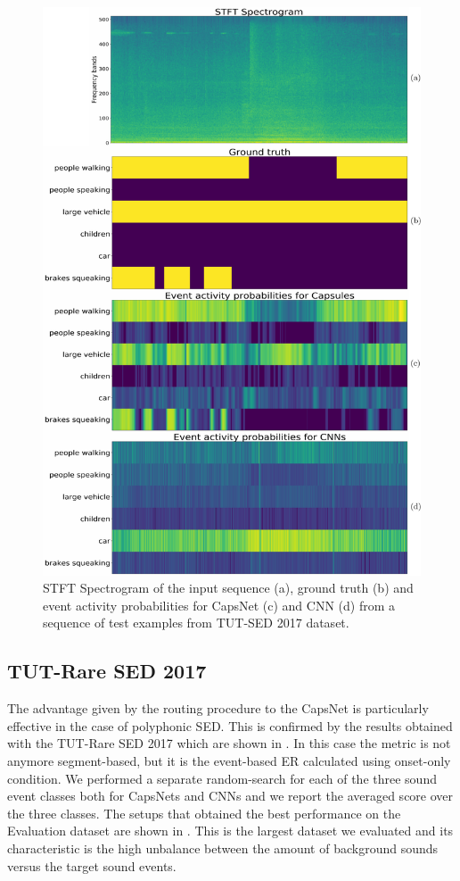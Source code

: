 \begin{figure}[h]
	\centering
	\includegraphics[width=0.5\columnwidth]{img/activations_17_v2}
	\caption{STFT Spectrogram of the input sequence (a), ground truth (b) and event activity probabilities for CapsNet (c) and CNN (d) from a sequence of test examples from TUT-SED 2017 dataset.}
	\label{fig:activations_17}
\end{figure}

\subsection{TUT-Rare SED 2017}
The advantage given by the routing procedure to the CapsNet is particularly effective in the case of polyphonic SED. This is confirmed by the results obtained with the TUT-Rare SED 2017 which are shown in . In this case the metric is not anymore segment-based, but it is the event-based ER calculated using onset-only condition. We performed a separate random-search for each of the three sound event classes both for CapsNets and CNNs and we report the averaged score over the three classes. The setups that obtained the best performance on the Evaluation dataset are shown in . This is the largest dataset we evaluated and its characteristic is the high unbalance between the amount of background sounds versus the target sound events.

